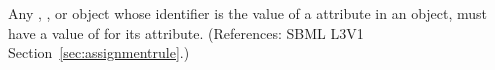 Any \Compartment, \Species, \Parameter or \SpeciesReference object whose
identifier is the value of a  attribute in an
\AssignmentRule object, must have a value of  for its
 attribute.  (References: SBML L3V1
Section~\ref{sec:assignmentrule}.)
